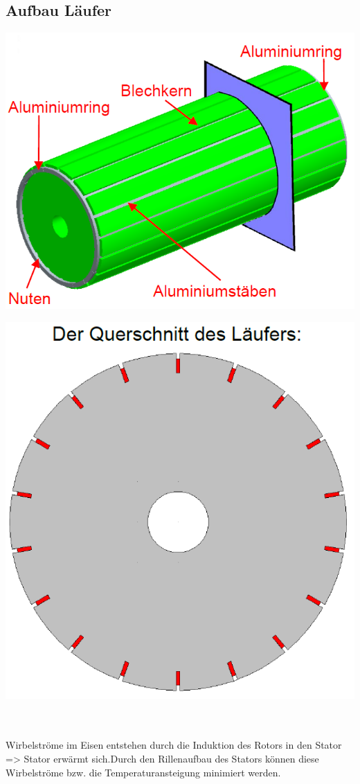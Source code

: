 \subsection{Aufbau Läufer}
\begin{minipage}[b]{0.5\linewidth}
	\includegraphics[scale = 0.4]{images/AsynchronRotor}
\end{minipage}
\begin{minipage}[b]{0.5\linewidth}
	\includegraphics[scale = 0.4]{images/QuerschnittAsynchronrotor}
\end{minipage} \\\\
Wirbelströme im Eisen entstehen durch die Induktion des Rotors in den Stator \newline => Stator erwärmt sich.\newline Durch den Rillenaufbau des Stators können diese Wirbelströme bzw. die Temperaturansteigung minimiert \newline werden.\\


